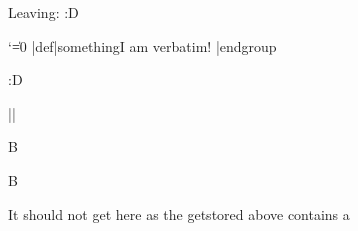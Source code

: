 



\scontents[store-env=another]
Leaving:
\bye :D
\endscontents

\scontents[store-env=test]
\begingroup
  \catcode`\|=0
  |def|something{I am verbatim!}
|endgroup
\something
\endscontents

\scontents[store-env=test]
\hello :D
\endscontents


\scnest
\def\nested{A}
\scnest
\def\nested{B}
\endscnest
\endscnest

\Scontents*{\abcde}
\Scontents*|\fghij|





\nested

\nested


It should not get here as the getstored above contains a \bye
